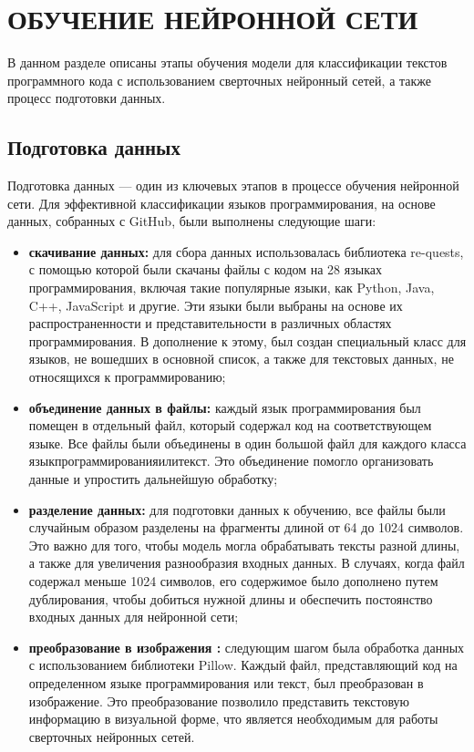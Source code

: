 {\newpage
\section{\MakeUppercase{Обучение нейронной сети}}
В данном разделе описаны этапы обучения модели для классификации текстов программного кода с использованием сверточных нейронный сетей, а также процесс подготовки данных.
{
\subsection{Подготовка данных}
Подготовка данных — один из ключевых этапов в процессе обучения нейронной сети. Для эффективной классификации языков программирования, на основе данных, собранных с GitHub, были выполнены следующие шаги:
\begin{itemize}
    \item \textbf{скачивание данных:} для сбора данных использовалась библиотека re-quests, с помощью которой были скачаны файлы с кодом на 28 языках программирования, включая такие популярные языки, как Python, Java, C++, JavaScript и другие. Эти языки были выбраны на основе их распространенности и представительности в различных областях программирования. В дополнение к этому, был создан специальный класс для языков, не вошедших в основной список, а также для текстовых данных, не относящихся к программированию;
    \item \textbf{объединение данных в файлы:} каждый язык программирования был помещен в отдельный файл, который содержал код на соответствующем языке. Все файлы были объединены в один большой файл для каждого класса языкпрограммированияилитекст. Это объединение помогло организовать данные и упростить дальнейшую обработку;   
    \item \textbf{разделение данных:} для подготовки данных к обучению, все файлы были случайным образом разделены на фрагменты длиной от 64 до 1024 символов. Это важно для того, чтобы модель могла обрабатывать тексты разной длины, а также для увеличения разнообразия входных данных. В случаях, когда файл содержал меньше 1024 символов, его содержимое было дополнено путем дублирования, чтобы добиться нужной длины и обеспечить постоянство входных данных для нейронной сети;    
    \item \textbf{преобразование в изображения :} следующим шагом была обработка данных с использованием библиотеки Pillow. Каждый файл, представляющий код на определенном языке программирования или текст, был преобразован в изображение. Это преобразование позволило представить текстовую информацию в визуальной форме, что является необходимым для работы сверточных нейронных сетей.    
\end{itemize}
}

}
